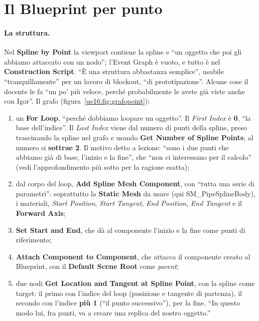\section{Il Blueprint per punto}
\label{ue16:sec:bypoint}

\paragraph{La struttura.} Nel \textbf{Spline by Point} la viewport contiene la spline e
``un oggetto che poi gli abbiamo attaccato con un nodo''; l'Event Graph è vuoto, e tutto è nel
\textbf{Construction Script}. ``È una struttura abbastanza semplice'', usabile ``tranquillamente''
per un lavoro di blockout, ``di prototipazione''. Alcune cose il docente le fa ``un po' più
veloce, perché probabilmente le avete già viste anche con Igor''. Il grafo
(figura~\ref{ue16:fig:grafopoint}):
\begin{enumerate}
  \item un \textbf{For Loop}, ``perché dobbiamo loopare un oggetto''. Il \emph{First Index} è
        \textbf{0}, ``la base dell'indice''. Il \emph{Last Index} viene dal numero di punti della
        spline, preso trascinando la spline nel grafo e usando \textbf{Get Number of Spline
        Points}; al numero si \textbf{sottrae 2}. Il motivo detto a lezione: ``sono i due punti
        che abbiamo già di base, l'inizio e la fine'', che ``non ci interessano per il
        calcolo'' (vedi l'approfondimento più sotto per la ragione esatta);
  \item dal corpo del loop, \textbf{Add Spline Mesh Component}, con ``tutta una serie di
        parametri'': soprattutto la \textbf{Static Mesh} da usare (qui SM\_PipeSplineBody), i
        materiali, \emph{Start Position}, \emph{Start Tangent}, \emph{End Position}, \emph{End
        Tangent} e il \textbf{Forward Axis};
  \item \textbf{Set Start and End}, che dà al componente l'inizio e la fine come punti di
        riferimento;
  \item \textbf{Attach Component to Component}, che attacca il componente creato al Blueprint,
        con il \textbf{Default Scene Root} come \emph{parent};
  \item due nodi \textbf{Get Location and Tangent at Spline Point}, con la spline come target:
        il primo con l'indice del loop (posizione e tangente di partenza), il secondo con
        l'indice \textbf{più 1} (``il punto successivo''), per la fine. ``In questo modo lui, fra
        punti, va a creare una replica del nostro oggetto.''
\end{enumerate}

